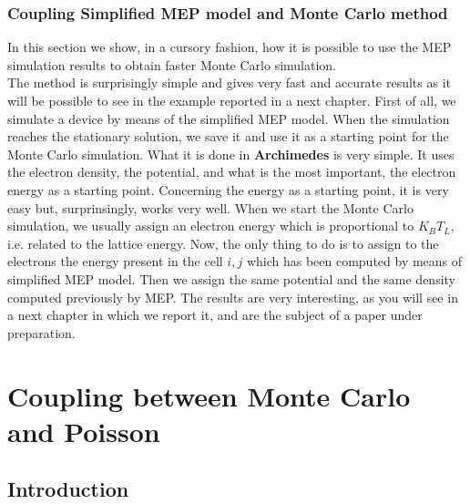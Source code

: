 \documentclass[12pt]{book}
\begin{document}
\subsection{Coupling Simplified MEP model and Monte Carlo method}

In this section we show, in a cursory fashion, how it is possible to use the MEP simulation results to obtain faster Monte Carlo simulation.\\
The method is surprisingly simple and gives very fast and accurate results as it will be possible to see in the example reported in a next chapter. First of all, we simulate a device by means of the simplified MEP model. When the simulation reaches the stationary solution, we save it and use it as a starting point for the Monte Carlo simulation. What it is done in \textbf{Archimedes} is very simple. It uses the electron density, the potential, and what is the most important, the electron energy as a starting point. Concerning the energy as a starting point, it is very easy but, surprinsingly, works very well. When we start the Monte Carlo simulation, we usually assign an electron energy which is proportional to $K_B T_L$, i.e. related to the lattice energy. Now, the only thing to do is to assign to the electrons the energy present in the cell $i,j$ which has been computed by means of simplified MEP model. Then we assign the same potential and the same density computed previously by MEP. The results are very interesting, as you will see in a next chapter in which we report it, and are the subject of a paper under preparation.



\chapter{Coupling between Monte Carlo and Poisson}

\section{Introduction}
\end{document}
